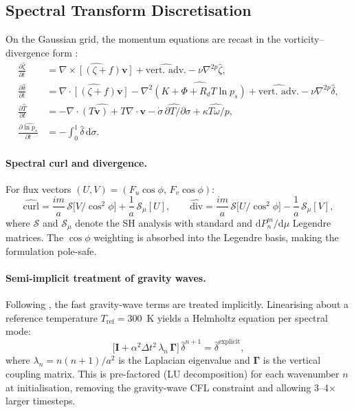 \documentclass[11pt,twoside]{report}
\newcommand{\dd}{\mathrm{d}}
\newcommand{\pp}{\partial}
\newcommand{\Rd}{R_d}
\newcommand{\vect}[1]{\bm{#1}}
\newcommand{\divg}{\nabla\!\cdot\!}
\newcommand{\curl}{\nabla\!\times\!}
\begin{document}
\subsection{Spectral Transform Discretisation}
\label{sec:spe}

On the Gaussian grid, the momentum equations are recast in the
vorticity--divergence form \citep{Bourke1972}:
\begin{align}
  \frac{\pp\hat\zeta}{\pp t} &=
  \widehat{\curl[(\zeta+f)\vect{v}]}
  + \widehat{\text{vert.\ adv.}} - \nu\nabla^{2p}\hat\zeta,
  \label{eq:spe-vor}\\
  \frac{\pp\hat\delta}{\pp t} &=
  \widehat{\divg[(\zeta+f)\vect{v}]}
  - \nabla^2\widehat{(K+\Phi+\Rd T\ln p_s)}
  + \widehat{\text{vert.\ adv.}} - \nu\nabla^{2p}\hat\delta,
  \label{eq:spe-div}\\
  \frac{\pp\hat T}{\pp t} &=
  \widehat{-\divg(T\vect{v})+T\divg\vect{v}}
  - \widehat{\dot\sigma\,\pp T/\pp\sigma}
  + \widehat{\kappa T\omega/p},
  \label{eq:spe-T}\\
  \frac{\pp\widehat{\ln p_s}}{\pp t} &= -\int_0^1\hat\delta\,\dd\sigma.
  \label{eq:spe-lnps}
\end{align}

\paragraph{Spectral curl and divergence.}
For flux vectors $(U,V)=(F_u\cos\phi,\,F_v\cos\phi)$:
\begin{equation}
  \widehat{\text{curl}} = \frac{im}{a}\,\mathcal{S}\bigl[V/\cos^2\!\phi\bigr]
  + \frac{1}{a}\,\mathcal{S}_\mu[U],
  \qquad
  \widehat{\text{div}} = \frac{im}{a}\,\mathcal{S}\bigl[U/\cos^2\!\phi\bigr]
  - \frac{1}{a}\,\mathcal{S}_\mu[V],
\end{equation}
where $\mathcal{S}$ and $\mathcal{S}_\mu$ denote the SH analysis with
standard and $\dd P_n^m/\dd\mu$ Legendre matrices.  The $\cos\phi$ weighting
is absorbed into the Legendre basis, making the formulation pole-safe.

\paragraph{Semi-implicit treatment of gravity waves.}
Following \citet{HoskinsSimmons1975}, the fast gravity-wave terms are
treated implicitly.  Linearising about a reference temperature $T_{\mathrm{ref}}=300$~K
yields a Helmholtz equation per spectral mode:
\begin{equation}
  \bigl[\mathbf{I} + \alpha^2\Delta t^2\,\lambda_n\,\mathbf{\Gamma}\bigr]\,
  \hat\delta^{n+1} = \hat\delta^{\mathrm{explicit}},
\end{equation}
where $\lambda_n = n(n+1)/a^2$ is the Laplacian eigenvalue and $\mathbf{\Gamma}$
is the vertical coupling matrix.  This is pre-factored (LU decomposition)
for each wavenumber $n$ at initialisation, removing the gravity-wave CFL
constraint and allowing 3--4$\times$ larger timesteps.
\end{document}
